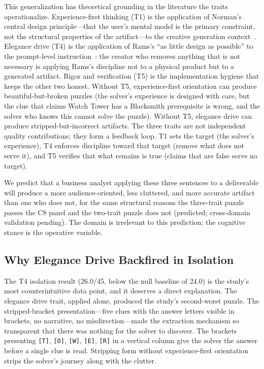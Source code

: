 This generalization has theoretical grounding in the literature the traits operationalize. Experience-first thinking (T1) is the application of Norman's central design principle---that the user's mental model is the primary constraint, not the structural properties of the artifact---to the creative generation context~\cite{norman2013design}. Elegance drive (T4) is the application of Rams's ``as little design as possible'' to the prompt-level instruction~\cite{rams1976design}: the creator who removes anything that is not necessary is applying Rams's discipline not to a physical product but to a generated artifact. Rigor and verification (T5) is the implementation hygiene that keeps the other two honest. Without T5, experience-first orientation can produce beautiful-but-broken puzzles (the solver's experience is designed with care, but the clue that claims Watch Tower has a Blacksmith prerequisite is wrong, and the solver who knows this cannot solve the puzzle). Without T5, elegance drive can produce stripped-but-incorrect artifacts. The three traits are not independent quality contributions; they form a feedback loop. T1 sets the target (the solver's experience), T4 enforces discipline toward that target (remove what does not serve it), and T5 verifies that what remains is true (claims that are false serve no target).

We predict that a business analyst applying these three sentences to a deliverable will produce a more audience-oriented, less cluttered, and more accurate artifact than one who does not, for the same structural reasons the three-trait puzzle passes the C8 panel and the two-trait puzzle does not (predicted; cross-domain validation pending). The domain is irrelevant to this prediction; the cognitive stance is the operative variable.

\subsection{Why Elegance Drive Backfired in Isolation}

The T4 isolation result (26.0/45, below the null baseline of 24.0) is the study's most counterintuitive data point, and it deserves a direct explanation. The elegance drive trait, applied alone, produced the study's second-worst puzzle. The stripped-bracket presentation---five clues with the answer letters visible in brackets, no narrative, no misdirection---made the extraction mechanism so transparent that there was nothing for the solver to discover. The brackets presenting \texttt{[T]}, \texttt{[O]}, \texttt{[W]}, \texttt{[E]}, \texttt{[R]} in a vertical column give the solver the answer before a single clue is read. Stripping form without experience-first orientation strips the solver's journey along with the clutter.

